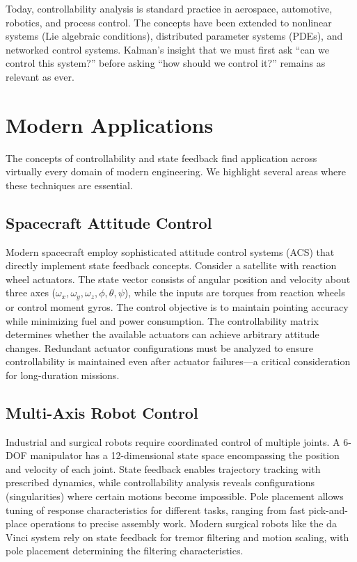 Today, controllability analysis is standard practice in aerospace, automotive, robotics, and process control. The concepts have been extended to nonlinear systems (Lie algebraic conditions), distributed parameter systems (PDEs), and networked control systems. Kalman's insight that we must first ask ``can we control this system?'' before asking ``how should we control it?'' remains as relevant as ever.

\section{Modern Applications}

The concepts of controllability and state feedback find application across virtually every domain of modern engineering. We highlight several areas where these techniques are essential.

\subsection{Spacecraft Attitude Control}

Modern spacecraft employ sophisticated attitude control systems (ACS) that directly implement state feedback concepts. Consider a satellite with reaction wheel actuators. The state vector consists of angular position and velocity about three axes ($\omega_x, \omega_y, \omega_z, \phi, \theta, \psi$), while the inputs are torques from reaction wheels or control moment gyros. The control objective is to maintain pointing accuracy while minimizing fuel and power consumption. The controllability matrix determines whether the available actuators can achieve arbitrary attitude changes. Redundant actuator configurations must be analyzed to ensure controllability is maintained even after actuator failures---a critical consideration for long-duration missions.

\subsection{Multi-Axis Robot Control}

Industrial and surgical robots require coordinated control of multiple joints. A 6-DOF manipulator has a 12-dimensional state space encompassing the position and velocity of each joint. State feedback enables trajectory tracking with prescribed dynamics, while controllability analysis reveals configurations (singularities) where certain motions become impossible. Pole placement allows tuning of response characteristics for different tasks, ranging from fast pick-and-place operations to precise assembly work. Modern surgical robots like the da Vinci system rely on state feedback for tremor filtering and motion scaling, with pole placement determining the filtering characteristics.

